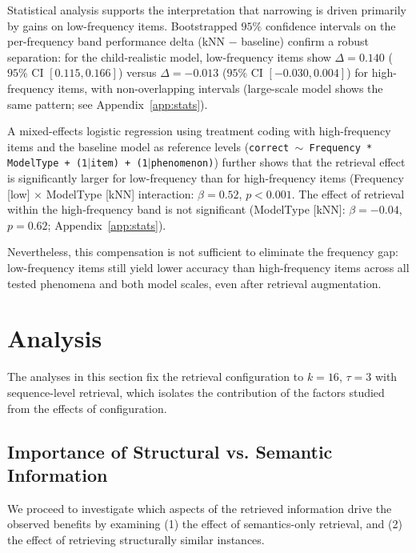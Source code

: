 Statistical analysis supports the interpretation that narrowing is driven primarily by gains on low-frequency items. Bootstrapped $95\%$ confidence intervals on the per-frequency band performance delta (kNN $-$ baseline) confirm a robust separation: for the child-realistic model, low-frequency items show $\Delta = 0.140$ ($95\%$ CI $[0.115, 0.166]$) versus $\Delta = -0.013$ ($95\%$ CI $[-0.030, 0.004]$) for high-frequency items, with non-overlapping intervals (large-scale model shows the same pattern; see Appendix~\ref{app:stats}). 

A mixed-effects logistic regression using treatment coding with high-frequency items and the baseline model as reference levels (\texttt{correct $\sim$ Frequency * ModelType + (1$\mid$item) + (1$\mid$phenomenon)}) further shows that the retrieval effect is significantly larger for low-frequency than for high-frequency items (Frequency [low] $\times$ ModelType [kNN] interaction: $\beta = 0.52$, $p < 0.001$. The effect of retrieval within the high-frequency band is not significant (ModelType [kNN]: $\beta = -0.04$, $p = 0.62$; Appendix~\ref{app:stats}). 

Nevertheless, this compensation is not sufficient to eliminate the frequency gap: low-frequency items still yield lower accuracy than high-frequency items across all tested phenomena and both model scales, even after retrieval augmentation.






\section{Analysis}

\noindent The analyses in this section fix the retrieval configuration to $k=16$, $\tau=3$ with sequence-level retrieval, which isolates the contribution of the factors studied from the effects of configuration. 

\subsection{Importance of Structural vs. Semantic Information}
\label{sec:multidimensional_binding}

We proceed to investigate which aspects of the retrieved information drive the observed benefits by examining (1) the effect of semantics-only retrieval, and (2) the effect of retrieving structurally similar instances.


